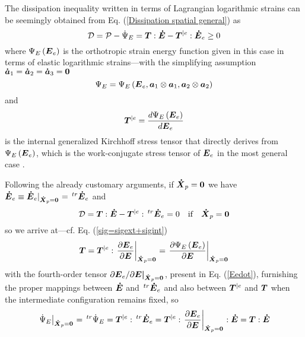 \documentclass[preprint,review,12pt,sort&compress]{elsarticle}%
\newcommand{\xpdo}[0]{\scriptsize\mathbf{\dot X}_p = \mathbf{0}\normalsize\mathbf{}}
\renewcommand{\mathbf}[1]{\mbox{\boldmath $#1$ \unboldmath}  \!\!}
\begin{document}
The dissipation inequality written in terms of Lagrangian logarithmic strains
can be seemingly obtained from Eq. (\ref{Dissipation spatial general}) as%
\begin{equation}
\mathcal{D}=\mathcal{P}-\dot{\Psi}_{E}=\mathbf{T}:\mathbf{\dot{E}}%
-\mathbf{T}^{|e}:\mathbf{\dot{E}}_{e}\geq0
\end{equation}
where $\Psi_{E}\left(  \mathbf{E}_{e}\right)  $ is the orthotropic strain
energy function given in this case in terms of elastic logarithmic
strains---with the simplifying assumption $\mathbf{\dot{a}}_{1}=\mathbf{\dot
{a}}_{2}=\mathbf{\dot{a}}_{3}=\mathbf{0}$%
\begin{equation}
\Psi_{E}=\Psi_{E}\left(  \mathbf{E}_{e},\mathbf{a}_{1}\otimes\mathbf{a}%
_{1},\mathbf{a}_{2}\otimes\mathbf{a}_{2}\right)
\end{equation}
and%
\begin{equation}
\mathbf{T}^{|e}=\frac{d\Psi_{E}\left(  \mathbf{E}_{e}\right)  }{d\mathbf{E}%
_{e}} \label{Tinte}%
\end{equation}
is the internal generalized Kirchhoff stress tensor that directly derives from
$\Psi_{E}\left(  \mathbf{E}_{e}\right)  $, which is the work-conjugate stress
tensor of $\mathbf{E}_{e}$ in the most general case \cite{LatMonAPM2016}.

Following the already customary arguments, if $\mathbf{\dot{X}}_{p}%
=\mathbf{0}$ we have $\mathbf{\dot{E}}_{e}\equiv\mathbf{\dot{E}}_{e}|_{%
\xpdo
}=\,^{tr}\mathbf{\dot{E}}_{e}$ and%
\begin{equation}
\mathcal{D}=\mathbf{T}:\mathbf{\dot{E}}-\mathbf{T}^{|e}:\,^{tr}\mathbf{\dot
{E}}_{e}=0\quad\text{if}\quad\mathbf{\dot{X}}_{p}=\mathbf{0}%
\end{equation}
so we arrive at---cf. Eq. (\ref{sig=sigext+sigint})%
\begin{equation}
\mathbf{T}=\mathbf{T}^{|e}:\left.  \frac{\partial\mathbf{E}_{e}}%
{\partial\mathbf{E}}\right\vert _{%
\xpdo
}=\left.  \frac{\partial\Psi_{E}\left(  \mathbf{E}_{e}\right)  }%
{\partial\mathbf{E}}\right\vert _{%
\xpdo
} \label{TTextTint}%
\end{equation}
with the fourth-order tensor $\partial\mathbf{E}_{e}/\partial\mathbf{E|}_{%
\xpdo
}$, present in Eq. (\ref{Eedot}), furnishing the proper mappings between
$\mathbf{\dot{E}}$ and $\,^{tr}\mathbf{\dot{E}}_{e}$ and also between
$\mathbf{T}^{|e}$ and $\mathbf{T}$ when the intermediate configuration remains
fixed, so%
\begin{equation}
\left.  \dot{\Psi}_{E}\right\vert _{%
\xpdo
}=\,^{tr}\dot{\Psi}_{E}=\mathbf{T}^{|e}:\,^{tr}\mathbf{\dot{E}}_{e}%
=\mathbf{T}^{|e}:\left.  \frac{\partial\mathbf{E}_{e}}{\partial\mathbf{E}%
}\right\vert _{%
\xpdo
}:\mathbf{\dot{E}}=\mathbf{T}:\mathbf{\dot{E}}%
\end{equation}
\end{document}
